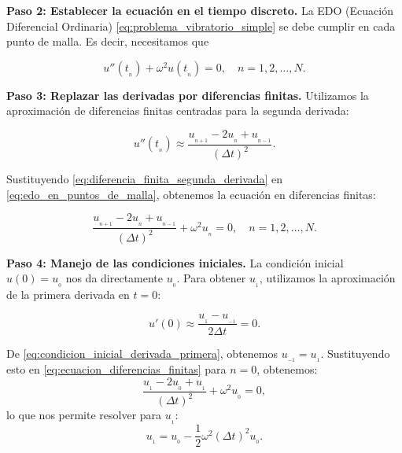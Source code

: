 \textbf{Paso 2: Establecer la ecuación en el tiempo discreto.} La EDO (Ecuación Diferencial Ordinaria) \eqref{eq:problema_vibratorio_simple} se debe
cumplir en cada punto de malla. Es decir, necesitamos que

\begin{equation}
    u''(t_{_n}) + \omega^2 u(t_{_n}) = 0, \quad n = 1, 2, \ldots, N.
    \label{eq:edo_en_puntos_de_malla}
\end{equation}

\textbf{Paso 3: Replazar las derivadas por diferencias finitas.} Utilizamos la aproximación de diferencias finitas centradas
para la segunda derivada:

\begin{equation}
    u''(t_{_n}) \approx \frac{u_{_{n+1}} - 2u_{_n} + u_{_{n-1}}}{(\Delta t)^2}.
    \label{eq:diferencia_finita_segunda_derivada}
\end{equation}

Sustituyendo \eqref{eq:diferencia_finita_segunda_derivada} en \eqref{eq:edo_en_puntos_de_malla}, obtenemos la ecuación
en diferencias finitas:

\begin{equation}
    \frac{u_{_{n+1}} - 2u_{_n} + u_{_{n-1}}}{(\Delta t)^2} + \omega^2 u_{_n} = 0, \quad n = 1, 2, \ldots, N.
    \label{eq:ecuacion_diferencias_finitas}
\end{equation}

\textbf{Paso 4: Manejo de las condiciones iniciales.} La condición inicial $u(0) = u_{_0}$ nos da directamente $u_{_0}$. Para
obtener $u_{_1}$, utilizamos la aproximación de la primera derivada en $t = 0$:

\begin{equation}
    u'(0) \approx \frac{u_{_1} - u_{_{-1}}}{2 \Delta t} = 0.
    \label{eq:condicion_inicial_derivada_primera}
\end{equation}

De \eqref{eq:condicion_inicial_derivada_primera}, obtenemos $u_{_{-1}} = u_{_1}$. Sustituyendo esto en
\eqref{eq:ecuacion_diferencias_finitas} para $n = 0$, obtenemos:
\begin{equation}
    \frac{u_{_1} - 2u_{_0} + u_{_1}}{(\Delta t)^2} + \omega^2 u_{_0} = 0,
    \label{eq:ecuacion_diferencias_finitas_n0}
\end{equation}
lo que nos permite resolver para $u_{_1}$:
\begin{equation}
    u_{_1} = u_{_0} - \frac{1}{2} \omega^2 (\Delta t)^2 u_{_0}.
    \label{eq:valor_u1}
\end{equation}

